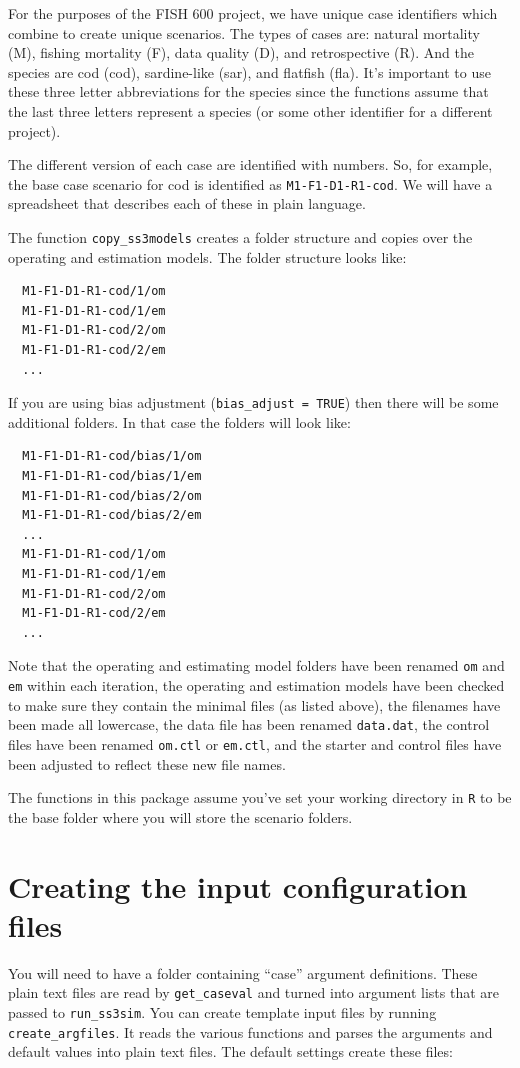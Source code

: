 \documentclass[12pt]{article}
\begin{document}
For the purposes of the FISH 600 project, we have unique case identifiers which 
combine to create unique scenarios. The types of cases are: natural mortality 
(M), fishing mortality (F), data quality (D), and retrospective (R). And the 
species are cod (cod), sardine-like (sar), and flatfish (fla). It's important 
to use these three letter abbreviations for the species since the functions 
assume that the last three letters represent a species (or some other 
identifier for a different project).

The different version of each case are identified with numbers. So, for 
example, the base case scenario for cod is identified as 
\texttt{M1-F1-D1-R1-cod}. We will have a spreadsheet that describes each of 
these in plain language.

The function \texttt{copy\_ss3models} creates a folder structure and copies 
over the operating and estimation models. The folder structure looks like:

\begin{verbatim}
  M1-F1-D1-R1-cod/1/om
  M1-F1-D1-R1-cod/1/em
  M1-F1-D1-R1-cod/2/om
  M1-F1-D1-R1-cod/2/em
  ...
\end{verbatim}

\noindent
If you are using bias adjustment (\texttt{bias\_adjust = TRUE}) then there 
will be some additional folders. In that case the folders will look like:

\begin{verbatim}
  M1-F1-D1-R1-cod/bias/1/om
  M1-F1-D1-R1-cod/bias/1/em
  M1-F1-D1-R1-cod/bias/2/om
  M1-F1-D1-R1-cod/bias/2/em
  ...
  M1-F1-D1-R1-cod/1/om
  M1-F1-D1-R1-cod/1/em
  M1-F1-D1-R1-cod/2/om
  M1-F1-D1-R1-cod/2/em
  ...
\end{verbatim}

\noindent
Note that the operating and estimating model folders have been renamed
\texttt{om} and \texttt{em} within each iteration, the operating and estimation 
models have been checked to make sure they contain the minimal files (as listed 
above), the filenames have been made all lowercase, the data file has been 
renamed \texttt{data.dat}, the control files have been renamed \texttt{om.ctl} 
or \texttt{em.ctl}, and the starter and control files have been adjusted to 
reflect these new file names.

The functions in this package assume you've set your working directory in 
\texttt{R} to be the base folder where you will store the scenario folders.

\section{Creating the input configuration files}
You will need to have a folder containing ``case'' argument definitions. These 
plain text files are read by \texttt{get\_caseval} and turned into argument 
lists that are passed to \texttt{run\_ss3sim}. You can create template input 
files by running \texttt{create\_argfiles}. It reads the various functions and 
parses the arguments and default values into plain text files. The default 
settings create these files:
\end{document}
